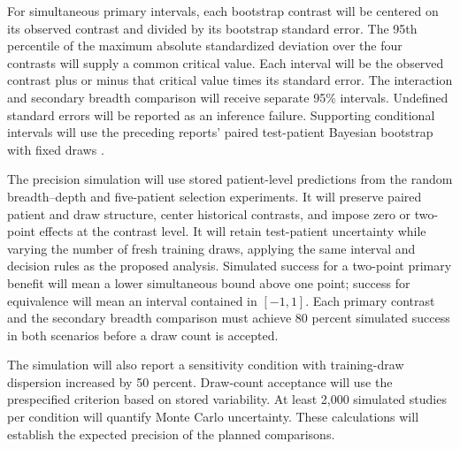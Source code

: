 \documentclass[11pt]{article}
\begin{document}
For simultaneous primary intervals, each bootstrap contrast will be centered on its observed contrast and divided by its bootstrap standard error. The 95th percentile of the maximum absolute standardized deviation over the four contrasts will supply a common critical value. Each interval will be the observed contrast plus or minus that critical value times its standard error. The interaction and secondary breadth comparison will receive separate 95\% intervals. Undefined standard errors will be reported as an inference failure. Supporting conditional intervals will use the preceding reports' paired test-patient Bayesian bootstrap with fixed draws \citep{rubin1981bayesian}.

The precision simulation will use stored patient-level predictions from the random breadth--depth and five-patient selection experiments. It will preserve paired patient and draw structure, center historical contrasts, and impose zero or two-point effects at the contrast level. It will retain test-patient uncertainty while varying the number of fresh training draws, applying the same interval and decision rules as the proposed analysis. Simulated success for a two-point primary benefit will mean a lower simultaneous bound above one point; success for equivalence will mean an interval contained in $[-1,1]$. Each primary contrast and the secondary breadth comparison must achieve 80 percent simulated success in both scenarios before a draw count is accepted.

The simulation will also report a sensitivity condition with training-draw dispersion increased by 50 percent. Draw-count acceptance will use the prespecified criterion based on stored variability. At least 2,000 simulated studies per condition will quantify Monte Carlo uncertainty. These calculations will establish the expected precision of the planned comparisons.



\end{document}
